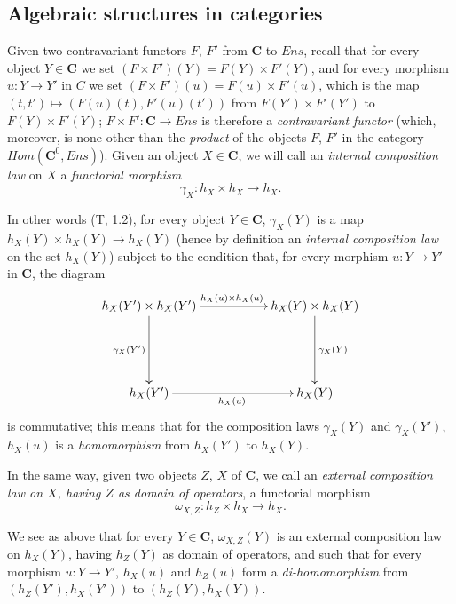\subsection{Algebraic structures in categories}
\label{subsection:0.8.2}

\begin{env}[8.2.1]
\label{0.8.2.1}
Given two contravariant functors $F$, $F'$ from $\boldsymbol{C}$ to
$\boldsymbol{\mathit{Ens}}$, recall that for every object $Y\in\boldsymbol{C}$ we set
$(F\times F')(Y)=F(Y)\times F'(Y)$, and for every morphism $u:Y\to Y'$ in
$C$ we set $(F\times F')(u)=F(u)\times F'(u)$, which is the map
$(t,t')\mapsto(F(u)(t),F'(u)(t'))$ from $F(Y')\times F'(Y')$ to
$F(Y)\times F'(Y)$; $F\times F':\boldsymbol{C}\to\boldsymbol{\mathit{Ens}}$ is therefore a
\emph{contravariant functor} (which, moreover, is none other than the
\emph{product} of the objects $F$, $F'$ in the category
$\boldsymbol{\mathit{Hom}}(\boldsymbol{C}^0,\boldsymbol{\mathit{Ens}})$). Given an object $X\in\boldsymbol{C}$, we
will call an \emph{internal composition law} on $X$ a \emph{functorial morphism}
\[
  \gamma_X:h_X\times h_X\to h_X.
  \tag{8.2.1.1}\label{0.8.2.1.1}
\]

In other words (T, 1.2), for every object $Y\in\boldsymbol{C}$, $\gamma_X(Y)$ is a
map $h_X(Y)\times h_X(Y)\to h_X(Y)$ (hence by definition an
\emph{internal composition law} on the set $h_X(Y)$) subject to the
condition that, for every morphism $u:Y\to Y'$ in $\boldsymbol{C}$, the diagram
\[
  \xymatrix{
    h_X(Y')\times h_X(Y')
      \ar[rr]^{h_X(u)\times h_X(u)}\ar[dd]_{\gamma_X(Y')} &&
    h_X(Y)\times h_X(Y)\ar[dd]^{\gamma_X(Y)}\\\\
    h_X(Y')\ar[rr]_{h_X(u)} && h_X(Y)
  }
\]
is commutative; this means that for the composition laws
$\gamma_X(Y)$ and $\gamma_X(Y')$, $h_X(u)$ is a \emph{homomorphism} from
$h_X(Y')$ to $h_X(Y)$.

In the same way, given two objects $Z$, $X$ of $\boldsymbol{C}$, we call an
\emph{external composition law on $X$, having $Z$ as domain of
operators}, a functorial morphism
\[
  \omega_{X,Z}:h_Z\times h_X\to h_X.
  \tag{8.2.1.2}\label{0.8.2.1.2}
\]

We see as above that for every $Y\in\boldsymbol{C}$, $\omega_{X,Z}(Y)$ is an external
composition law on $h_X(Y)$, having $h_Z(Y)$ as domain of
operators, and such that for every morphism $u:Y\to Y'$, $h_X(u)$ and
$h_Z(u)$ form a \emph{di-homomorphism} from
$(h_Z(Y'),h_X(Y'))$ to $(h_Z(Y),h_X(Y))$.
\end{env}

